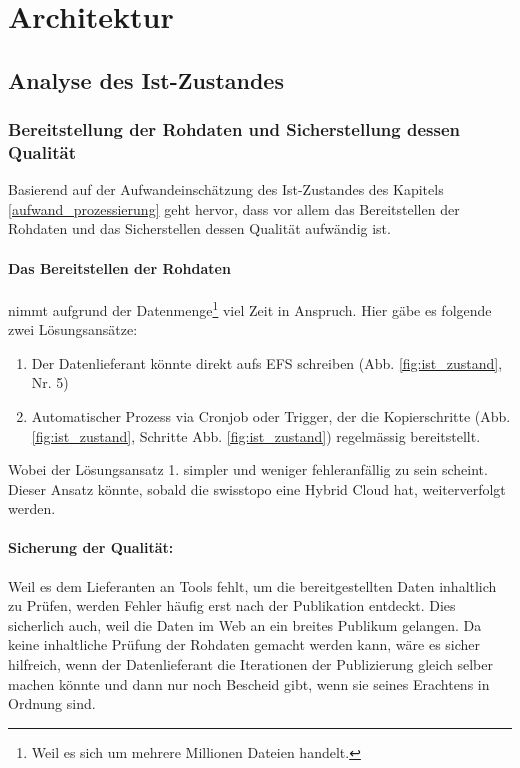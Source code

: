 \section{Architektur}

\subsection{Analyse des Ist-Zustandes}
\subsubsection{Bereitstellung der Rohdaten und Sicherstellung dessen Qualität}
Basierend auf der Aufwandeinschätzung des Ist-Zustandes des Kapitels \ref{aufwand_prozessierung} geht hervor, dass vor allem das Bereitstellen der Rohdaten und das Sicherstellen dessen Qualität aufwändig ist. 

\paragraph{Das Bereitstellen der Rohdaten} nimmt aufgrund der Datenmenge\footnote{Weil es sich um mehrere Millionen Dateien handelt.} viel Zeit in Anspruch. Hier gäbe es folgende zwei Lösungsansätze:
\begin{enumerate}
\item Der Datenlieferant könnte direkt aufs EFS schreiben (Abb. \ref{fig:ist_zustand}, Nr. 5)
\item Automatischer Prozess via Cronjob oder Trigger, der die Kopierschritte (Abb. \ref{fig:ist_zustand}, Schritte Abb. \ref{fig:ist_zustand}) regelmässig bereitstellt.
\end{enumerate}

Wobei der Lösungsansatz 1. simpler und weniger fehleranfällig zu sein scheint. Dieser Ansatz könnte, sobald die swisstopo eine Hybrid Cloud hat, weiterverfolgt werden.

\paragraph{Sicherung der Qualität:} Weil es dem Lieferanten an Tools fehlt, um die bereitgestellten Daten inhaltlich zu Prüfen, werden Fehler 
häufig erst nach der Publikation entdeckt. Dies sicherlich auch, weil die Daten im Web an ein breites Publikum gelangen. Da keine inhaltliche Prüfung der Rohdaten gemacht werden kann, wäre es sicher hilfreich, wenn der Datenlieferant die Iterationen der Publizierung gleich selber machen könnte und dann nur noch Bescheid gibt, wenn sie seines Erachtens in Ordnung sind.

